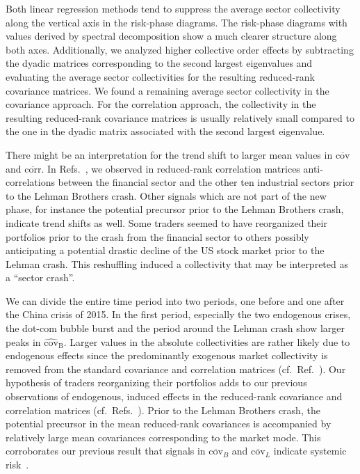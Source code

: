 \documentclass[aps, pra, groupedaddress, showkeys, twocolumn, floatfix, 10pt]{revtex4-2}
\newcommand*\mean[1]{\overline{#1}}
\newcommand*\meanNONDiag[1]{\widehat{#1}}
\begin{document}
Both linear regression methods tend to suppress
the average sector collectivity along the vertical axis in the risk-phase diagrams. The risk-phase diagrams with values derived by spectral decomposition show a
much clearer structure along both axes. Additionally, we analyzed higher collective order effects by subtracting the dyadic matrices corresponding to the second largest
eigenvalues and evaluating the average sector collectivities for the resulting reduced-rank covariance matrices. 
We found a remaining average sector collectivity in
the covariance approach. For the correlation approach,
the collectivity in the resulting reduced-rank covariance matrices is usually relatively small compared to
the one in the dyadic matrix associated with the second largest eigenvalue.

There might be an interpretation for the trend shift to larger mean values in $\mean{\text{cov}}$
and $\mean{\text{corr}}$.
In Refs.~\cite{Heckens_2020,Heckens_2022}, we observed in reduced-rank correlation matrices anti-correlations between the financial sector and the other ten industrial sectors prior to the Lehman Brothers crash.
Other signals which are not part of the new phase, for instance the potential precursor prior to the Lehman Brothers crash, indicate trend shifts as well.
Some traders seemed to have reorganized their portfolios prior to the crash from the financial sector to others possibly anticipating a potential drastic decline of the US stock market prior to the Lehman crash.
This reshuffling induced a collectivity that may be interpreted as a ``sector crash''.

We can divide the entire time period into two periods, one before and one after the China crisis of 2015.
In the first period, especially the two endogenous crises, the dot-com bubble burst and the period around the Lehman crash show larger peaks in $\meanNONDiag{\text{cov}}_{\text{B}}$. 
Larger values in the absolute collectivities are rather likely due to endogenous effects
since the predominantly exogenous market collectivity is removed from the standard covariance and correlation matrices (cf.~Ref.~\cite{Heckens_2022}). Our hypothesis of traders reorganizing
their portfolios adds to our previous observations of endogenous, induced effects in the reduced-rank covariance and correlation matrices (cf.~Refs.~\cite{Heckens_2020,Heckens_2022}).
Prior to the Lehman Brothers crash, the potential precursor in the mean reduced-rank covariances is accompanied by relatively large mean covariances corresponding to the market mode. This corroborates
our previous result that signals in $\overline{\text{cov}}_{{B}}$ and $\mean{\text{cov}}_{{L}}$ indicate systemic risk~\cite{Heckens_2022}.
\end{document}
